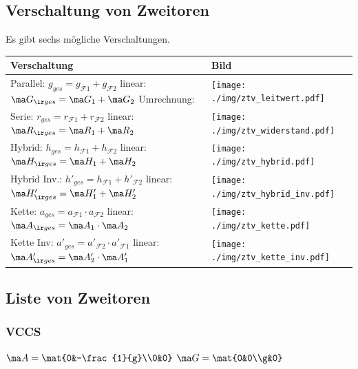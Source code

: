 \documentclass[fs, footer]{latex4ei}
\begin{document}
\begin{multicols*}{4}
	\subsection{Verschaltung von Zweitoren}
	Es gibt sechs mögliche Verschaltungen.\\
	\begin{tabular}{@{}ll}
		Verschaltung & Bild\\ \hline
		\parbox{3cm}{Parallel: $g_{ges}=g_{\mathcal F1}+g_{\mathcal F2}$ \\ linear: $\ma G_{\ir ges} = \ma G_1 + \ma G_2$ \\ Umrechnung: } & \parbox{2.5cm}{\texttt{[image: ./img/ztv\_leitwert.pdf]}}\\[2em]
		\parbox{3cm}{Serie: $r_{ges}=r_{\mathcal F1}+r_{\mathcal F2}$ \\ linear: $\ma R_{\ir ges} = \ma R_1 + \ma R_2$} & \parbox{2.5cm}{\texttt{[image: ./img/ztv\_widerstand.pdf]}}\\[2em]
		\parbox{3cm}{Hybrid: $h_{ges}=h_{\mathcal F1}+h_{\mathcal F2}$ \\ linear: $\ma H_{\ir ges} = \ma H_1 + \ma H_2$} & \parbox{2.5cm}{\texttt{[image: ./img/ztv\_hybrid.pdf]}}\\[2em]
		\parbox{3.5cm}{Hybrid Inv.: $h'_{ges}=h_{\mathcal F1}+h'_{\mathcal F2}$ \\ linear: $\ma H'_{\ir ges} = \ma H'_1 + \ma H'_2$} & \parbox{2.5cm}{\texttt{[image: ./img/ztv\_hybrid\_inv.pdf]}}\\[2em]
		\parbox{3cm}{Kette: $a_{ges}=a_{\mathcal F1} \cdot a_{\mathcal F2}$ \\ linear: $\ma A_{\ir ges} = \ma A_1 \cdot \ma A_2$} & \parbox{2.5cm}{\texttt{[image: ./img/ztv\_kette.pdf]}}\\[2em]
		\parbox{3cm}{Kette Inv: $a'_{ges}=a'_{\mathcal F2} \cdot a'_{\mathcal F1}$ \\ linear: $\ma A'_{\ir ges} = \ma A'_2 \cdot \ma A'_1$} & \parbox{2.5cm}{\texttt{[image: ./img/ztv\_kette\_inv.pdf]}}\\
	\end{tabular}

	\subsection{Liste von Zweitoren}
		\subsubsection{VCCS}
		$\ma A = \mat{0&-\frac{1}{g}\\0&0}$\quad
		$\ma G = \mat{0&0\\g&0}$

\end{multicols*}
\end{document}
